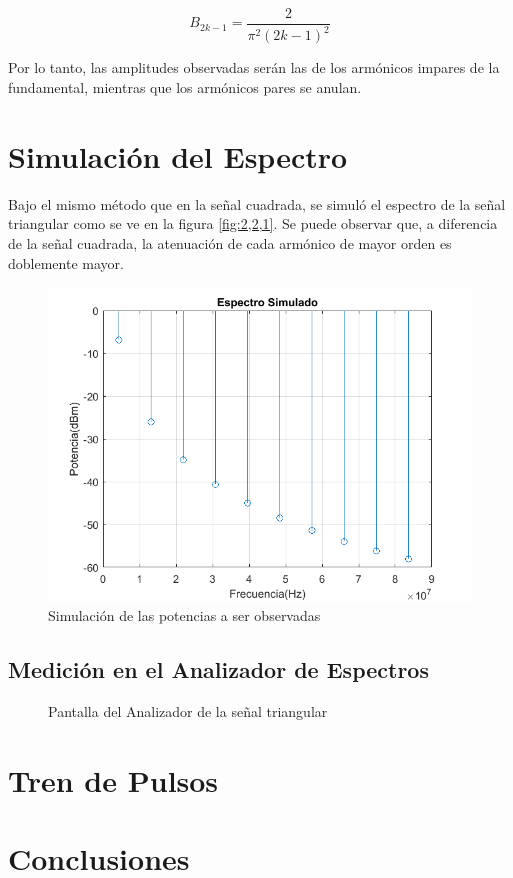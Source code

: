     \begin{equation}
        B_{2k-1} =\frac{2}{\pi^2 (2k-1)^2}
    \end{equation}

    Por lo tanto, las amplitudes observadas serán las de los armónicos
    impares de la fundamental, mientras que los armónicos pares se anulan.

    \section{Simulación del Espectro}
    Bajo el mismo método que en la señal cuadrada, se simuló el espectro
    de la señal triangular como se ve en la figura \ref{fig:2,2,1}. Se puede
    observar que, a diferencia de la señal cuadrada, la atenuación de cada
    armónico de mayor orden es doblemente mayor.

    \begin{figure}[ht]
        \begin{center}
            \includegraphics[width=0.7\linewidth]{contenido/img/spect_tri.png}
            \caption{Simulación de las potencias a ser observadas}
            \label{fig:2,2,2}
        \end{center}
    \end{figure}

    \subsection{Medición en el Analizador de Espectros}

    \begin{figure}[ht]
        \begin{center}
            \caption{Pantalla del Analizador de la señal triangular}
            \label{fig:ansr,tri}
        \end{center}
    \end{figure}

\section{Tren de Pulsos}

\section{Conclusiones}